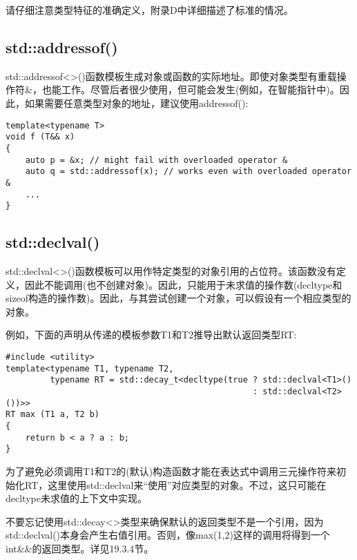请仔细注意类型特征的准确定义，附录D中详细描述了标准的情况。

\subsection{std::addressof()}

std::addressof<>()函数模板生成对象或函数的实际地址。即使对象类型有重载操作符\&，也能工作。尽管后者很少使用，但可能会发生(例如，在智能指针中)。因此，如果需要任意类型对象的地址，建议使用addressof():

\begin{lstlisting}[style=styleCXX]
template<typename T>
void f (T&& x)
{
	auto p = &x; // might fail with overloaded operator &
	auto q = std::addressof(x); // works even with overloaded operator &
	...
}
\end{lstlisting}

\subsection{std::declval()}

std::declval<>()函数模板可以用作特定类型的对象引用的占位符。该函数没有定义，因此不能调用(也不创建对象)。因此，只能用于未求值的操作数(decltype和sizeof构造的操作数)。因此，与其尝试创建一个对象，可以假设有一个相应类型的对象。

例如，下面的声明从传递的模板参数T1和T2推导出默认返回类型RT:

\begin{lstlisting}[style=styleCXX]
#include <utility>
template<typename T1, typename T2,
		 typename RT = std::decay_t<decltype(true ? std::declval<T1>()
												  : std::declval<T2>())>>
RT max (T1 a, T2 b)
{
	return b < a ? a : b;
}
\end{lstlisting}

为了避免必须调用T1和T2的(默认)构造函数才能在表达式中调用三元操作符来初始化RT，这里使用std::declval来“使用”对应类型的对象。不过，这只可能在decltype未求值的上下文中实现。

不要忘记使用std::decay<>类型来确保默认的返回类型不是一个引用，因为std::declval()本身会产生右值引用。否则，像max(1,2)这样的调用将得到一个int\&\&的返回类型。详见19.3.4节。






